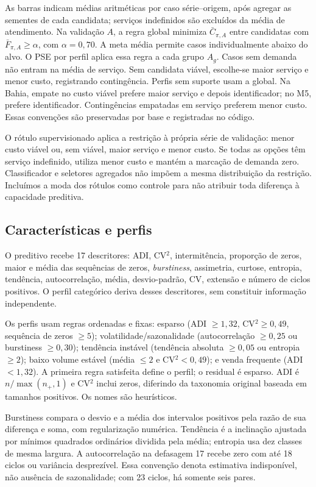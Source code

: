 \documentclass[preprint,12pt]{elsarticle}
\begin{document}
As barras indicam médias aritméticas por caso série--origem, após agregar as sementes de cada candidata; serviços indefinidos são excluídos da média de atendimento. Na validação $A$, a regra global minimiza $\bar C_{\pi,A}$ entre candidatas com $\bar F_{\pi,A}\geq\alpha$, com $\alpha=0{,}70$. A meta média permite casos individualmente abaixo do alvo. O PSE por perfil aplica essa regra a cada grupo $A_g$. Casos sem demanda não entram na média de serviço. Sem candidata viável, escolhe-se maior serviço e menor custo, registrando contingência. Perfis sem suporte usam a global. Na Bahia, empate no custo viável prefere maior serviço e depois identificador; no M5, prefere identificador. Contingências empatadas em serviço preferem menor custo. Essas convenções são preservadas por base e registradas no código.

O rótulo supervisionado aplica a restrição à própria série de validação: menor custo viável ou, sem viável, maior serviço e menor custo. Se todas as opções têm serviço indefinido, utiliza menor custo e mantém a marcação de demanda zero. Classificador e seletores agregados não impõem a mesma distribuição da restrição. Incluímos a moda dos rótulos como controle para não atribuir toda diferença à capacidade preditiva.

\subsection{Características e perfis}
O preditivo recebe 17 descritores: ADI, CV$^2$, intermitência, proporção de zeros, maior e média das sequências de zeros, \textit{burstiness}, assimetria, curtose, entropia, tendência, autocorrelação, média, desvio-padrão, CV, extensão e número de ciclos positivos. O perfil categórico deriva desses descritores, sem constituir informação independente.

Os perfis usam regras ordenadas e fixas: esparso (ADI $\geq1{,}32$, CV$^2\geq0{,}49$, sequência de zeros $\geq5$); volatilidade/sazonalidade (autocorrelação $\geq0{,}25$ ou burstiness $\geq0{,}30$); tendência instável (tendência absoluta $\geq0{,}05$ ou entropia $\geq2$); baixo volume estável (média $\leq2$ e CV$^2<0{,}49$); e venda frequente (ADI $<1{,}32$). A primeira regra satisfeita define o perfil; o residual é esparso. ADI é $n/\max(n_+,1)$ e CV$^2$ inclui zeros, diferindo da taxonomia original baseada em tamanhos positivos. Os nomes são heurísticos.

Burstiness compara o desvio e a média dos intervalos positivos pela razão de sua diferença e soma, com regularização numérica. Tendência é a inclinação ajustada por mínimos quadrados ordinários dividida pela média; entropia usa dez classes de mesma largura. A autocorrelação na defasagem 17 recebe zero com até 18 ciclos ou variância desprezível. Essa convenção denota estimativa indisponível, não ausência de sazonalidade; com 23 ciclos, há somente seis pares.
\end{document}
